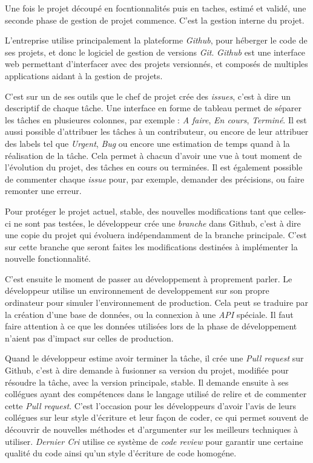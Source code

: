 \documentclass[12pt,a4paper]{article}
\begin{document}
  Une fois le projet découpé en focntionnalités puis en taches, estimé et
  validé, une seconde phase de gestion de projet commence. C'est la
  gestion interne du projet.

  L'entreprise utilise principalement la plateforme \emph{Github}, pour
  héberger le code de ses projets, et donc le logiciel de gestion de
  versions \emph{Git}. \emph{Github} est une interface web permettant
  d'interfacer avec des projets versionnés, et composés de multiples
  applications aidant à la gestion de projets.

  \bigskip

  C'est sur un de ses outils que le chef de projet crée des \emph{issues},
  c'est à dire un descriptif de chaque tâche. Une interface en forme de
  tableau permet de séparer les tâches en plusieures colonnes, par exemple
  : \emph{A faire}, \emph{En cours}, \emph{Terminé}. Il est aussi possible
  d'attribuer les tâches à un contributeur, ou encore de leur attribuer
  des labels tel que \emph{Urgent}, \emph{Bug} ou encore une estimation de
  temps quand à la réalisation de la tâche. Cela permet à chacun d'avoir
  une vue à tout moment de l'évolution du projet, des tâches en cours ou
  terminées. Il est également possible de commenter chaque \emph{issue}
  pour, par exemple, demander des précisions, ou faire remonter une
  erreur.

  \bigskip

  Pour protéger le projet actuel, stable, des nouvelles modifications tant
  que celles-ci ne sont pas testées, le développeur crée une
  \emph{branche} dans Github, c'est à dire une copie du projet qui
  évoluera indépendamment de la branche principale. C'est sur cette
  branche que seront faites les modifications destinées à implémenter la
  nouvelle fonctionnalité.

  \bigskip

  C'est ensuite le moment de passer au développement à proprement parler.
  Le développeur utilise un environnement de developpement sur son propre
  ordinateur pour simuler l'environnement de production. Cela peut se
  traduire par la création d'une base de données, ou la connexion à une
  \emph{API} spéciale. Il faut faire attention à ce que les données
  utilisées lors de la phase de développement n'aient pas d'impact sur
  celles de production.

  \bigskip

  Quand le développeur estime avoir terminer la tâche, il crée une
  \emph{Pull request} sur Github, c'est à dire demande à fusionner sa
  version du projet, modifiée pour résoudre la tâche, avec la version
  principale, stable. Il demande ensuite à ses collégues ayant des
  compétences dans le langage utilisé de relire et de commenter cette
  \emph{Pull request}. C'est l'occasion pour les développeurs d'avoir
  l'avis de leurs collégues sur leur style d'écriture et leur façon de
  coder, ce qui permet souvent de découvrir de nouvelles méthodes et
  d'argumenter sur les meilleurs techniques à utiliser. \emph{Dernier Cri}
  utilise ce système de \emph{code review} pour garantir une certaine
  qualité du code ainsi qu'un style d'écriture de code homogéne.
\end{document}
